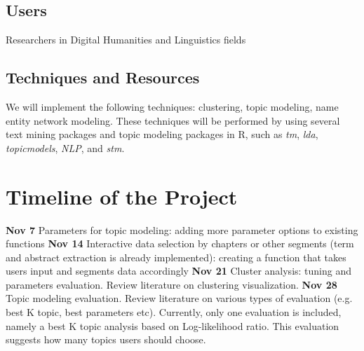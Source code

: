 \documentclass[11pt,a4paper]{amsart}
\begin{document}
\subsection{Users} Researchers in Digital Humanities and Linguistics fields
\subsection{Techniques and Resources} We will implement the following techniques: clustering, topic modeling, name entity network modeling. These techniques will be performed by using several text mining packages and topic modeling packages in R, such as \textit{tm}, \textit{lda}, \textit{topicmodels}, \textit{NLP}, and \textit{stm}.

\section{Timeline of the Project}
 \noindent \textbf{Nov 7}  Parameters for topic modeling: adding more parameter options to existing functions
 \vskip5pt
 \noindent \textbf{Nov 14}  Interactive data selection by chapters or other segments (term and abstract extraction is already implemented): creating a function that takes users input and segments data accordingly
  \vskip5pt
 \noindent \textbf{Nov 21} Cluster analysis: tuning and parameters evaluation. Review literature on clustering visualization. %
  \vskip5pt
 \noindent \textbf{Nov 28}  Topic modeling evaluation. Review literature on various types of evaluation (e.g. best K topic, best parameters etc). Currently, only one evaluation is included, namely a best K topic analysis based on Log-likelihood ratio. This evaluation suggests how many topics users should choose.
\end{document}
